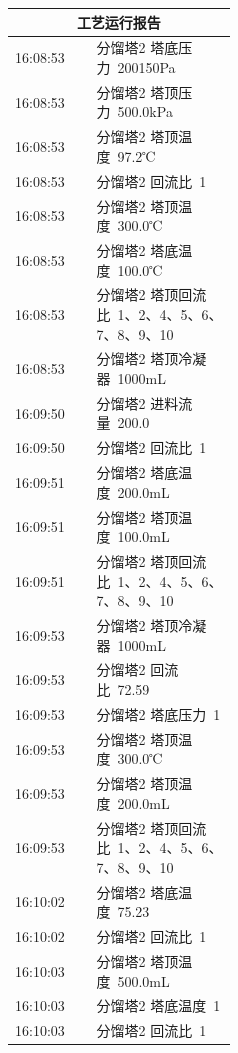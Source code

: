 \documentclass[UTF8,10pt,a4paper,fontset=fandol]{ctexart}
\begin{document}
\begin{center}
\begin{tabular}{|p{0.12\linewidth}|p{0.32\linewidth}|}
\end{tabular}
\hfill
\begin{tabular}{|p{0.12\linewidth}|p{0.32\linewidth}|}
\hline
\multicolumn{2}{c}{\textbf{工艺运行报告}}\\
\hline
16:08:53 & 分馏塔2 塔底压力~200150Pa\\ \hline
16:08:53 & 分馏塔2 塔顶压力~500.0kPa\\ \hline
16:08:53 & 分馏塔2 塔顶温度~97.2℃\\ \hline
16:08:53 & 分馏塔2 回流比~1\\ \hline
16:08:53 & 分馏塔2 塔顶温度~300.0℃\\ \hline
16:08:53 & 分馏塔2 塔底温度~100.0℃\\ \hline
16:08:53 & 分馏塔2 塔顶回流比~1、2、4、5、6、7、8、9、10\\ \hline
16:08:53 & 分馏塔2 塔顶冷凝器~1000mL\\ \hline
16:09:50 & 分馏塔2 进料流量~200.0\\ \hline
16:09:50 & 分馏塔2 回流比~1\\ \hline
16:09:51 & 分馏塔2 塔底温度~200.0mL\\ \hline
16:09:51 & 分馏塔2 塔顶温度~100.0mL\\ \hline
16:09:51 & 分馏塔2 塔顶回流比~1、2、4、5、6、7、8、9、10\\ \hline
16:09:53 & 分馏塔2 塔顶冷凝器~1000mL\\ \hline
16:09:53 & 分馏塔2 回流比~72.59\\ \hline
16:09:53 & 分馏塔2 塔底压力~1\\ \hline
16:09:53 & 分馏塔2 塔顶温度~300.0℃\\ \hline
16:09:53 & 分馏塔2 塔顶温度~200.0mL\\ \hline
16:09:53 & 分馏塔2 塔顶回流比~1、2、4、5、6、7、8、9、10\\ \hline
16:10:02 & 分馏塔2 塔底温度~75.23\\ \hline
16:10:02 & 分馏塔2 回流比~1\\ \hline
16:10:03 & 分馏塔2 塔顶温度~500.0mL\\ \hline
16:10:03 & 分馏塔2 塔底温度~1\\ \hline
16:10:03 & 分馏塔2 回流比~1\\ \hline
\end{tabular}

\vspace{0.8cm}


\end{center}
\end{document}
